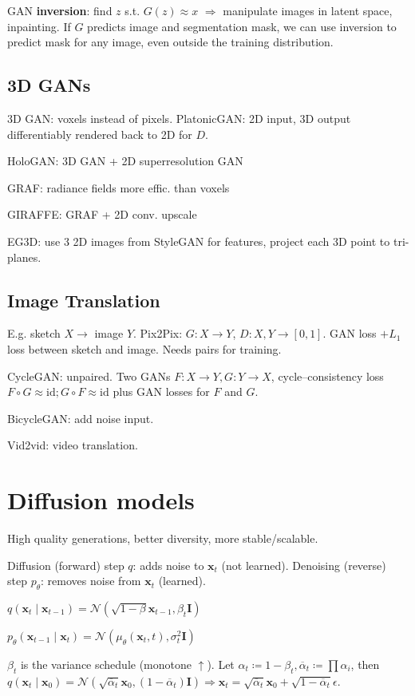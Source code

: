 \documentclass[11pt,landscape,a4paper,fleqn]{article}
\def\myvector#1{\mathbf{#1}}
\def\vx{{\myvector{x}}}
\def\mymatrix#1{\mathbf{#1}}
\def\mI{{\mymatrix{I}}}
\begin{document}
\begin{multicols*}{4}
GAN \textbf{inversion}: find $z$ s.t. $G(z) \approx x$ $ \Rightarrow $ manipulate images in latent space, inpainting.
If $G$ predicts image and segmentation mask,
we can use inversion to predict mask for any image, even outside the training distribution.

\subsection{3D GANs}

3D GAN: voxels instead of pixels.
PlatonicGAN: 2D input, 3D output differentiably rendered back to 2D for $D$.

HoloGAN: 3D GAN + 2D superresolution GAN

GRAF: radiance fields more effic. than voxels

GIRAFFE: GRAF + 2D conv. upscale

EG3D: use 3 2D images from StyleGAN for features, project each 3D point to tri-planes.

\subsection{Image Translation}

E.g. sketch $X \to$ image $Y$.
Pix2Pix:
$G : X \to Y$,
$D : X, Y \to [0, 1]$.
GAN loss $+ L_1$ loss between sketch and image.
Needs pairs for training.

CycleGAN: unpaired.
Two GANs $F: X \to Y, G : Y \to X$,
cycle--consistency loss $F \circ G \approx \mathrm{id}; G \circ F \approx \mathrm{id}$
plus GAN losses for $F$ and $G$.

BicycleGAN: add noise input.

Vid2vid: video translation.

\section{Diffusion models}

High quality generations, better diversity, more stable/scalable.

Diffusion (forward) step $q$: adds noise to $\vx_t$ (not learned).
Denoising (reverse) step $p_\theta$: removes noise from $\vx_t$ (learned).

$q(\vx_t \mid \vx_{t-1}) = \mathcal{N}(\sqrt{1 - \beta} \vx_{t-1}, \beta_t \mI)$

$p_\theta(\vx_{t-1} \mid \vx_t) = \mathcal{N}(\mu_\theta(\vx_t, t), \sigma_t^2 \mI)$

$\beta_t$ is the variance schedule (monotone $\uparrow$).
Let $\alpha_t \coloneqq 1 - \beta_t, \overline{\alpha}_t \coloneqq \prod \alpha_i$,
then $q(\vx_t \mid \vx_0) = \mathcal{N}(\sqrt{\overline{\alpha}_t} \vx_0, (1 - \overline{\alpha}_t)\mI)
\Rightarrow \vx_t = \sqrt{\overline{\alpha}_t} \vx_0 + \sqrt{1 - \overline{\alpha}_t}\epsilon$.


\end{multicols*}
\end{document}
